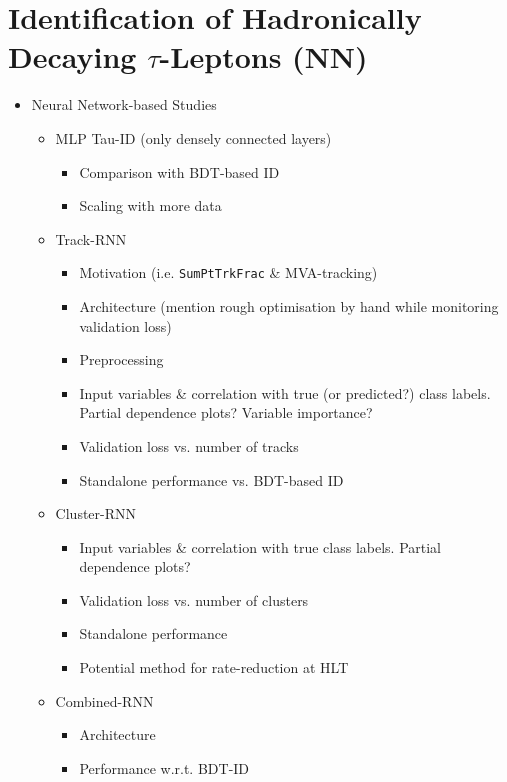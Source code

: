 \chapter{Identification of Hadronically Decaying $\tau$-Leptons (NN)}
\label{sec:rnn}

\begin{itemize}
\item Neural Network-based Studies
  \begin{itemize}
  \item MLP Tau-ID (only densely connected layers)
    \begin{itemize}
    \item Comparison with BDT-based ID
    \item Scaling with more data
    \end{itemize}
  \item Track-RNN
    \begin{itemize}
    \item Motivation (i.e. \texttt{SumPtTrkFrac} \& MVA-tracking)
    \item Architecture (mention rough optimisation by hand while monitoring
      validation loss)
    \item Preprocessing
    \item Input variables \& correlation with true (or predicted?) class labels.
      Partial dependence plots? Variable importance?
    \item Validation loss vs. number of tracks
    \item Standalone performance vs. BDT-based ID
    \end{itemize}
  \item Cluster-RNN
    \begin{itemize}
    \item Input variables \& correlation with true class labels. Partial
      dependence plots?
    \item Validation loss vs. number of clusters
    \item Standalone performance
    \item Potential method for rate-reduction at HLT
    \end{itemize}
  \item Combined-RNN
    \begin{itemize}
    \item Architecture
    \item Performance w.r.t. BDT-ID
    \end{itemize}
  \end{itemize}
\end{itemize}




















